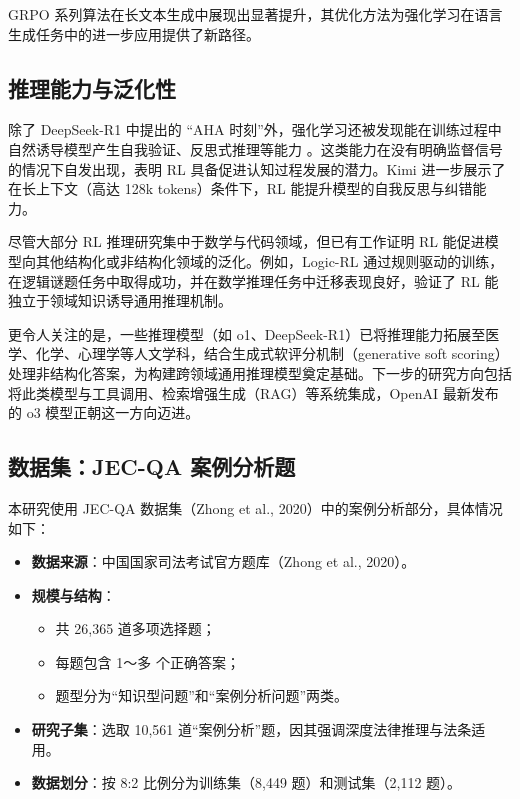 \documentclass{pkuthesis}
\begin{document}
GRPO 系列算法在长文本生成中展现出显著提升，其优化方法为强化学习在语言生成任务中的进一步应用提供了新路径。

\subsection{推理能力与泛化性}

除了 DeepSeek-R1 中提出的 “AHA 时刻”外，强化学习还被发现能在训练过程中自然诱导模型产生自我验证、反思式推理等能力 \cite{chen2024competitive, yang2025research}。这类能力在没有明确监督信号的情况下自发出现，表明 RL 具备促进认知过程发展的潜力。Kimi\cite{kimi2025scaling} 进一步展示了在长上下文（高达 128k tokens）条件下，RL 能提升模型的自我反思与纠错能力。

尽管大部分 RL 推理研究集中于数学与代码领域，但已有工作证明 RL 能促进模型向其他结构化或非结构化领域的泛化。例如，Logic-RL\cite{zhou2025logicrl} 通过规则驱动的训练，在逻辑谜题任务中取得成功，并在数学推理任务中迁移表现良好，验证了 RL 能独立于领域知识诱导通用推理机制。

更令人关注的是，一些推理模型（如 o1、DeepSeek-R1）已将推理能力拓展至医学、化学、心理学等人文学科，结合生成式软评分机制（generative soft scoring）处理非结构化答案，为构建跨领域通用推理模型奠定基础。下一步的研究方向包括将此类模型与工具调用、检索增强生成（RAG）等系统集成，OpenAI 最新发布的 o3 模型正朝这一方向迈进。


\subsection{数据集：JEC-QA 案例分析题}
本研究使用 JEC-QA 数据集（Zhong et al., 2020）中的案例分析部分，具体情况如下：
\begin{itemize}
  \item \textbf{数据来源}：中国国家司法考试官方题库（Zhong et al., 2020）。
  \item \textbf{规模与结构}：
    \begin{itemize}
      \item 共 26,365 道多项选择题；
      \item 每题包含 1～多 个正确答案；
      \item 题型分为“知识型问题”和“案例分析问题”两类。
    \end{itemize}
  \item \textbf{研究子集}：选取 10,561 道“案例分析”题，因其强调深度法律推理与法条适用。
  \item \textbf{数据划分}：按 8:2 比例分为训练集（8,449 题）和测试集（2,112 题）。
\end{itemize}
\end{document}
